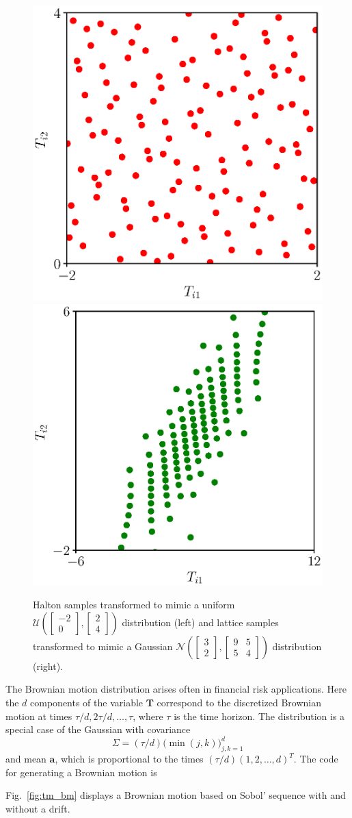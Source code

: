 \documentclass[graybox]{svmult}
\begin{document}
\begin{figure}[t]
	\includegraphics[width=.45\textwidth]{QMCSoftwareArticle/vfigs/tm_uniform.eps} 
	\includegraphics[width=.45\textwidth]{QMCSoftwareArticle/vfigs/tm_gaussian.eps}
	\caption{Halton samples transformed to mimic a uniform $\mathcal{U}\left( \begin{bmatrix} -2 \\ 0 \end{bmatrix},\begin{bmatrix} 2 \\ 4 \end{bmatrix} \right)$ 
	distribution (left) and lattice samples transformed to mimic a Gaussian $\mathcal{N}\left(\begin{bmatrix} 3 \\ 2 \end{bmatrix}, \begin{bmatrix} 9 & 5 \\ 5 & 4 \end{bmatrix} \right)$ distribution (right).}
	\label{fig:tm_ug}
\end{figure}

The Brownian motion distribution arises often in financial risk applications.  Here the $d$ components of the variable $\boldsymbol{T}$ correspond to the discretized Brownian motion at times $\tau/d, 2\tau/d, \ldots, \tau$, where $\tau$ is the time horizon.  The distribution is a special case of the Gaussian with covariance 
\begin{equation} \label{eq:BMcov}
	\Sigma = (\tau/d) \bigl (\min(j,k) \bigr)_{j,k=1}^d
\end{equation}
and mean $\boldsymbol{a}$, which  is proportional to the times $(\tau/d)(1, 2, \ldots, d)^T$. The code for generating a Brownian motion is

Fig.~\ref{fig:tm_bm} displays a Brownian motion based on Sobol' sequence with and without a drift.
\end{document}

